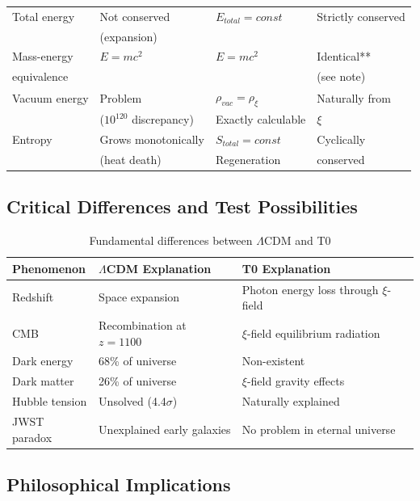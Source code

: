 \documentclass[12pt,a4paper]{report}
\begin{document}
\begin{longtable}{p{4.0cm}p{3.2cm}p{2.8cm}p{2.8cm}}
	Total energy & Not conserved & $E_{total} = const$ & Strictly conserved \\
	& (expansion) & & \\[0.3em]
	
	Mass-energy & $E = mc^2$ & $E = mc^2$ & Identical** \\
	equivalence & & & (see note) \\[0.3em]
	
	Vacuum energy & Problem & $\rho_{vac} = \rho_\xi$ & Naturally from \\
	& ($10^{120}$ discrepancy) & Exactly calculable & $\xi$ \\[0.3em]
	
	Entropy & Grows monotonically & $S_{total} = const$ & Cyclically \\
	& (heat death) & Regeneration & conserved \\[0.3em]
	
\end{longtable}
\normalsize

\subsection{Critical Differences and Test Possibilities}
\label{subsec:critical_differences}

\begin{table}[h]
	\centering
	\begin{tabular}{p{4cm}p{5cm}p{5cm}}
		\toprule
		\textbf{Phenomenon} & \textbf{$\Lambda$CDM Explanation} & \textbf{T0 Explanation} \\
		\midrule
		Redshift & Space expansion & Photon energy loss through $\xi$-field \\
		CMB & Recombination at $z=1100$ & $\xi$-field equilibrium radiation \\
		Dark energy & 68\% of universe & Non-existent \\
		Dark matter & 26\% of universe & $\xi$-field gravity effects \\
		Hubble tension & Unsolved (4.4$\sigma$) & Naturally explained \\
		JWST paradox & Unexplained early galaxies & No problem in eternal universe \\
		\bottomrule
	\end{tabular}
	\caption{Fundamental differences between $\Lambda$CDM and T0}
\end{table}

\subsection{Philosophical Implications}
\label{subsec:philosophical_implications}
\end{document}
